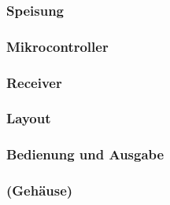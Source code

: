 \subsubsection{Speisung}
\subsubsection{Mikrocontroller}
\subsubsection{Receiver}
\subsubsection{Layout}
\subsubsection{Bedienung und Ausgabe}
\subsubsection{(Gehäuse)}